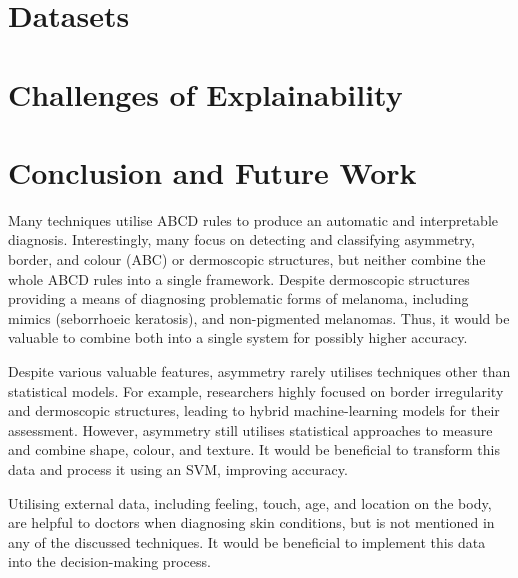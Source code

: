 \section{Datasets}

\section{Challenges of Explainability}

\section{Conclusion and Future Work}
Many techniques utilise ABCD rules to produce an automatic and interpretable diagnosis. Interestingly, many focus on detecting and classifying asymmetry, border, and colour (ABC) or dermoscopic structures, but neither combine the whole ABCD rules into a single framework. Despite dermoscopic structures providing a means of diagnosing problematic forms of melanoma, including mimics (seborrhoeic keratosis)\cite{Izikson2002}, and non-pigmented melanomas. Thus, it would be valuable to combine both into a single system for possibly higher accuracy.

Despite various valuable features, asymmetry rarely utilises techniques other than statistical models. For example, researchers highly focused on border irregularity and dermoscopic structures, leading to hybrid machine-learning models for their assessment. However, asymmetry still utilises statistical approaches to measure and combine shape, colour, and texture. It would be beneficial to transform this data and process it using an SVM, improving accuracy.

Utilising external data, including feeling, touch, age, and location on the body, are helpful to doctors when diagnosing skin conditions, but is not mentioned in any of the discussed techniques. It would be beneficial to implement this data into the decision-making process.
